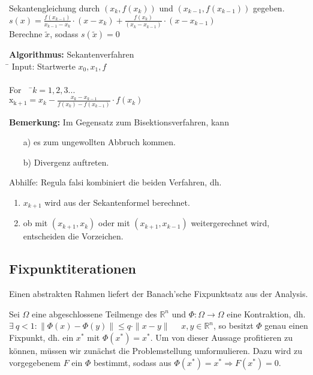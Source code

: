 \documentclass[10pt,a4paper]{article}
\theoremstyle{definition} \newtheorem{definition}{Definition}[section]
\theoremstyle{bemerkung}    \newtheorem{bemerkung}{Bemerkung}[]
\begin{document}
Sekantengleichung durch $(x_k, f(x_k))$ und $(x_{k-1}, f(x_{k-1}))$ gegeben.
\newline
\\$s(x)=\frac{f(x_{k-1})}{x_{k-1}-x_k} \cdot (x-x_k)+\frac{f(x_k)}{(x_k-x_{k-1})}\cdot (x-x_{k-1})$
\newline
\\Berechne $\tilde x$, sodass $s(\tilde x)=0$
\begin{tabbing}

\textbf{Algorithmus:} Sekantenverfahren\\
\= \kill
Input: Startwerte $x_0, x_1, f$\\
\newline
\\\> For \ \ \=$k=1,2,3...$\\ 
\> \> $\mathrm{x_{k+1}}= x_k - \frac{x_k-x_{k-1}}{f(x_k)-f(x_{k-1})} \cdot f(x_k)$ \\
\end{tabbing}

\textbf{Bemerkung:}
Im Gegensatz zum Bisektionsverfahren, kann
\begin{enumerate}
\item[a)] es zum ungewollten Abbruch kommen.
\item[b)] Divergenz auftreten.
\end{enumerate}

Abhilfe: Regula falsi kombiniert die beiden Verfahren, dh.
\begin{enumerate}
\item  $x_{k+1}$ wird aus der Sekantenformel berechnet.
\item  ob mit $(x_{k+1},x_k)$ oder mit $(x_{k+1},x_{k-1})$ weitergerechnet wird, entscheiden die Vorzeichen.
\end{enumerate}


\subsection{Fixpunktiterationen}

Einen abstrakten Rahmen liefert der Banach'sche Fixpunktsatz aus der Analysis.
\newline

\noindent Sei $\Omega$ eine abgeschlossene Teilmenge des $\mathbb{R}^n$ und $\Phi: \Omega
\longrightarrow \Omega$ eine Kontraktion, dh. $\exists \ q<1: \| \Phi(x) -
\Phi(y)\| \leq q\cdot \|x-y\|$ \ \ $x,y \in \mathbb{R}^n$, so besitzt $\Phi$
genau einen Fixpunkt, dh. ein $x^*$ mit $\Phi(x^*)=x^*$.  Um von dieser Aussage
profitieren zu können, müssen wir zunächst die Problemstellung umformulieren.
Dazu wird zu vorgegebenem $F$ ein $\Phi$ bestimmt, sodass aus $\Phi(x^*)=x^*
\Rightarrow F(x^*)=0$.
\end{document}
